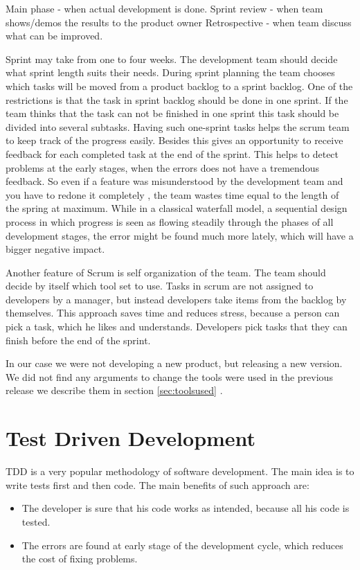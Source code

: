   Main phase - when actual development is done.
  Sprint review - when team shows/demos the results to the product owner
  Retrospective - when team discuss what can be improved.


  Sprint may take from one to four weeks. The development team should decide
  what sprint length suits their needs. During sprint planning the team chooses
  which tasks will be moved from a product backlog to a sprint backlog.
  One of the restrictions is that the task in sprint backlog should be done in one sprint.
  If the team thinks that the task can not be finished in one sprint this task
  should be divided into several subtasks. 
  Having such one-sprint tasks helps the scrum team to keep track of the
  progress easily. Besides this gives an opportunity to receive feedback for each completed task at the end
  of the sprint. This helps to detect problems at the early stages, when
  the errors does not have a tremendous feedback. So even if a feature was misunderstood by the development team
  and you have to redone it completely , the team wastes time equal to the
  length of the spring at maximum. While in a classical waterfall model, a sequential design process in which
  progress is seen as flowing steadily through the phases of all development stages, 
  the error might be found much more lately, which will have a bigger negative impact.

  Another feature of Scrum is self organization of the team. The team should
  decide by itself which tool set to use. Tasks in scrum are not assigned to
  developers by a manager, but instead developers take items from the backlog by themselves.
  This approach saves time and reduces stress, because a person can pick a task,
  which he likes and understands. Developers pick tasks that they
  can finish before the end of the sprint.

  In our case we were not developing a new product, but releasing a new version.
  We did not find any arguments to change the tools were used in the previous
  release we describe them in section \ref{sec:toolsused} .

  \section{Test Driven Development}
    TDD is a very popular methodology of software development. The main idea is to
    write tests first and then code. The main benefits of such approach are:
      \begin{itemize}
        \item The developer is sure that his code works as intended, because all
        his code is tested.
        \item The errors are found at early stage of the development cycle, which
        reduces the cost of fixing problems.
      \end{itemize}
      
